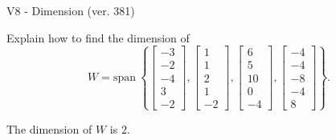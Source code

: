 \begin{exercise}
  \begin{exerciseTitle}V8 - Dimension (ver. 381)\end{exerciseTitle}
  \begin{exerciseStatement}
    Explain how to find the dimension of 
\[W=\mathrm{span}\ \left\{\left[\begin{array}{r}
-3 \\
-2 \\
-4 \\
3 \\
-2
\end{array}\right] , \left[\begin{array}{r}
1 \\
1 \\
2 \\
1 \\
-2
\end{array}\right] , \left[\begin{array}{r}
6 \\
5 \\
10 \\
0 \\
-4
\end{array}\right] , \left[\begin{array}{r}
-4 \\
-4 \\
-8 \\
-4 \\
8
\end{array}\right]\right\}.\]



  \end{exerciseStatement}
  \begin{exerciseAnswer}
   The dimension of \(W\) is  \(2\).
  


  \end{exerciseAnswer}
\end{exercise}